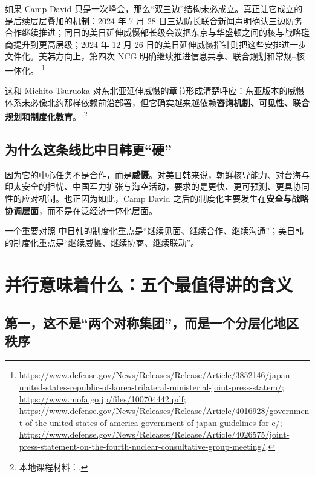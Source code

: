 \documentclass[a4paper]{article}
\begin{document}
如果 Camp David 只是一次峰会，那么“双三边”结构未必成立。真正让它成立的是后续层层叠加的机制：2024 年 7 月 28 日三边防长联合新闻声明确认三边防务合作继续推进；同日的美日延伸威慑部长级会议把东京与华盛顿之间的核与战略磋商提升到更高层级；2024 年 12 月 26 日的美日延伸威慑指针则把这些安排进一步文件化。美韩方向上，第四次 NCG 明确继续推进信息共享、联合规划和常规--核一体化。%
\footnote{\url{https://www.defense.gov/News/Releases/Release/Article/3852146/japan-united-states-republic-of-korea-trilateral-ministerial-joint-press-statem/}; \url{https://www.mofa.go.jp/files/100704442.pdf}; \url{https://www.defense.gov/News/Releases/Release/Article/4016928/government-of-the-united-states-of-america-government-of-japan-guidelines-for-e/}; \url{https://www.defense.gov/News/Releases/Release/Article/4026575/joint-press-statement-on-the-fourth-nuclear-consultative-group-meeting/}.}

这和 Michito Tsuruoka 对东北亚延伸威慑的章节形成清楚呼应：东亚版本的威慑体系未必像北约那样依赖前沿部署，但它确实越来越依赖\textbf{咨询机制、可见性、联合规划和制度化教育}。%
\footnote{本地课程材料：.}

\subsection{为什么这条线比中日韩更“硬”}

因为它的中心任务不是合作，而是\textbf{威慑}。对美日韩来说，朝鲜核导能力、对台海与印太安全的担忧、中国军力扩张与海空活动，要求的是更快、更可预测、更具协同性的应对机制。也正因为如此，Camp David 之后的制度化主要发生在\textbf{安全与战略协调层面}，而不是在泛经济一体化层面。

\begin{evidencebox}{一个重要对照}
中日韩的制度化重点是“继续见面、继续合作、继续沟通”；美日韩的制度化重点是“继续威慑、继续协商、继续联动”。
\end{evidencebox}

\section{并行意味着什么：五个最值得讲的含义}

\subsection{第一，这不是“两个对称集团”，而是一个分层化地区秩序}
\end{document}
